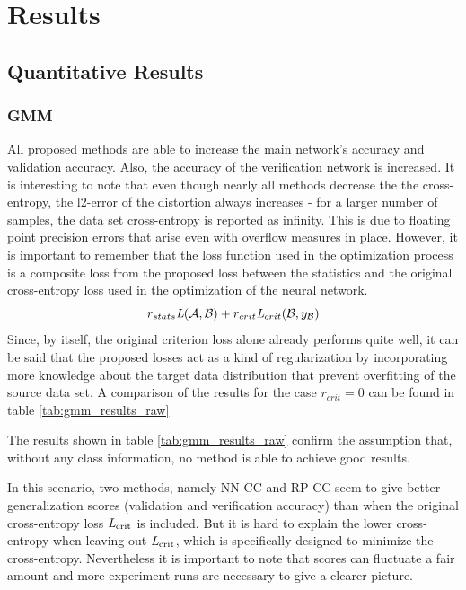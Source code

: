 \section{Results}

\subsection{Quantitative Results}

\subsubsection{GMM}

All proposed methods are able to increase the main network's accuracy and validation accuracy.
Also, the accuracy of the verification network is increased.
It is interesting to note that even though nearly all methods decrease the 
the cross-entropy, the l2-error of the distortion always increases
- for a larger number of samples, the data set cross-entropy is reported as infinity.
This is due to floating point precision errors that arise even with overflow measures in place.
However, it is important to remember that the loss function used in the optimization process
is a composite loss from the proposed loss between the statistics
and the original cross-entropy loss used in the optimization of the neural network.
\[
    r_{stats} \textit{L}(\mathcal A, \mathcal B) + r_{crit}\textit{L}_{crit}(\mathcal B, y_{\mathcal B})
\]
Since, by itself, the original criterion loss alone already performs quite well, 
it can be said that the proposed losses act as a kind of regularization 
by incorporating more knowledge about the target data distribution that prevent overfitting
of the source data set.
A comparison of the results for the case $r_{crit}=0$ can be found in table \ref{tab:gmm_results_raw}

The results shown in table \ref{tab:gmm_results_raw} confirm the assumption that,
without any class information, no method is able to achieve good results.

In this scenario, two methods, namely NN CC and RP CC seem to give 
better generalization scores 
(validation and verification accuracy) than when the original cross-entropy loss 
$\textit{L}_\text{crit}$ is included.
But it is hard to explain the lower cross-entropy when leaving out 
$\textit{L}_\text{crit}$, which is specifically designed to minimize the cross-entropy.
Nevertheless it is important to note that scores can fluctuate a fair amount and more 
experiment runs are necessary to give a clearer picture.

